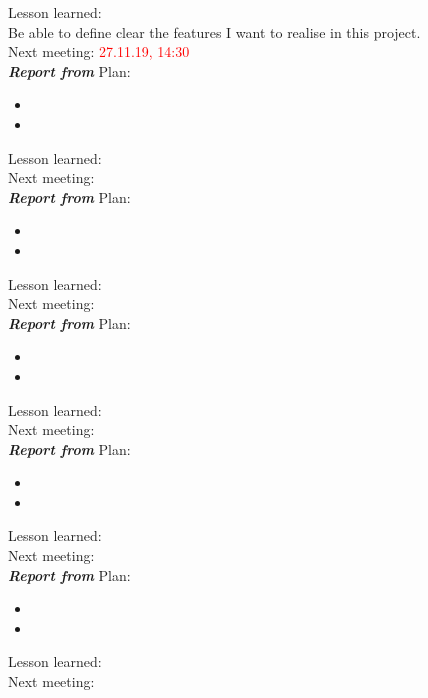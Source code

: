 \documentclass{scrartcl}
\begin{document}
Lesson learned:\\
Be able to define clear the features I want to realise in this project.\\
Next meeting: \textcolor{red}{27.11.19, 14:30} \\




\textbf{\textit{Report from }}
Plan:\\
\begin{itemize}
	\item	

	\item	

\end{itemize}

Lesson learned:\\

Next meeting: \\


\textbf{\textit{Report from }}
Plan:\\
\begin{itemize}
	\item	
	
	\item	

\end{itemize}

Lesson learned:\\

Next meeting: \\


\textbf{\textit{Report from }}
Plan:\\
\begin{itemize}
	\item	 

	\item	

\end{itemize}

Lesson learned:\\

Next meeting: \\



\textbf{\textit{Report from }}
Plan:\\
\begin{itemize}
	\item	

	\item	

\end{itemize}

Lesson learned:\\

Next meeting: \\



\textbf{\textit{Report from }}
Plan:\\
\begin{itemize}
	\item	 

	\item	

\end{itemize}

Lesson learned:\\

Next meeting: \\
\end{document}
